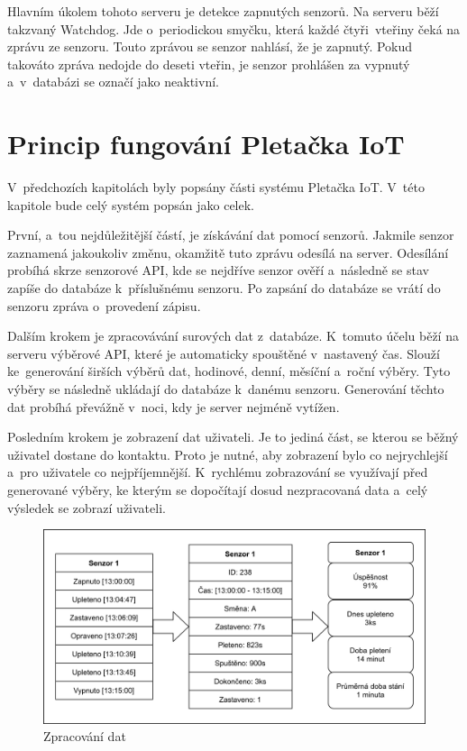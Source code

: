 \documentclass{template/socthesis}
\begin{document}
Hlavním úkolem tohoto serveru je detekce zapnutých senzorů.
Na serveru běží takzvaný Watchdog.
Jde o~periodickou smyčku, která každé čtyři~vteřiny čeká na zprávu ze senzoru.
Touto zprávou se senzor nahlásí, že je zapnutý. Pokud takováto zpráva nedojde do deseti vteřin, je senzor prohlášen za vypnutý a~v~databázi se označí jako neaktivní.



\section{Princip fungování Pletačka IoT}
V~předchozích kapitolách byly popsány části systému Pletačka IoT.
V~této kapitole bude celý systém popsán jako celek.

První, a~tou nejdůležitější částí, je získávání dat pomocí senzorů.
Jakmile senzor zaznamená jakoukoliv změnu, okamžitě tuto zprávu odesílá na server.
Odesílání probíhá skrze senzorové API, kde se nejdříve senzor ověří a~následně se stav zapíše do databáze k~příslušnému senzoru.
Po zapsání do databáze se vrátí do senzoru zpráva o~provedení zápisu. 

Dalším krokem je zpracovávání surových dat z~databáze.
K~tomuto účelu běží na serveru výběrové API, které je automaticky spouštěné v~nastavený čas.
Slouží ke~generování širších výběrů dat, hodinové, denní, měsíční a~roční výběry.
Tyto výběry se následně ukládají do databáze k~danému senzoru.
Generování těchto dat probíhá převážně v~noci, kdy je server nejméně vytížen.

Posledním krokem je zobrazení dat uživateli.
Je to jediná část, se kterou se běžný uživatel dostane do kontaktu.
Proto je nutné, aby zobrazení bylo co nejrychlejší a~pro uživatele co nejpříjemnější.
K~rychlému zobrazování se využívají před generované výběry, ke kterým se dopočítají dosud nezpracovaná data a~celý výsledek se zobrazí uživateli.

\begin{figure}[htbp]
    \centering
    \includegraphics[width=\textwidth]{img/Princip.png}
    \caption{Zpracování dat}
    \label{fig:princip}
\end{figure}
\end{document}
